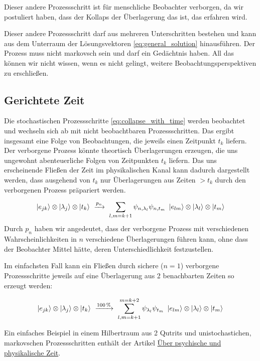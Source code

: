 \documentclass[12pt]{article}
\begin{document}
Dieser andere Prozessschritt ist für menschliche Beobachter verborgen, da wir postuliert haben, dass der Kollaps der Überlagerung das ist, das erfahren wird. 

Dieser andere Prozessschritt darf aus mehreren Unterschritten bestehen und kann aus dem Unterraum der Lösungsvektoren \eqref{eq:general_solution} hinausführen. Der Prozess muss nicht markovsch sein und darf ein Gedächtnis haben. All das können wir nicht wissen, wenn es nicht gelingt, weitere Beobachtungsperspektiven zu erschließen. 

\subsection{Gerichtete Zeit}

Die stochastischen Prozessschritte \eqref{eq:collapse_with_time} werden beobachtet und wechseln sich ab mit nicht beobachtbaren Prozessschritten. Das ergibt insgesamt eine Folge von Beobachtungen, die jeweils einen Zeitpunkt $t_k$ liefern. Der verborgene Prozess könnte theortisch Überlagerungen erzeugen, die uns ungewohnt abenteuerliche Folgen von Zeitpunkten $t_k$ liefern. Das uns erscheinende Fließen der Zeit im physikalischen Kanal kann dadurch dargestellt werden, dass ausgehend von $t_k$ nur Überlagerungen aus Zeiten $> t_k$ durch den verborgenen Prozess präpariert werden.

\begin{equation} 
\label{eq:preparation_with_time}
\ket{e_{jk}} \otimes \ket{\lambda_j} \otimes \ket{t_k}
\ \xrightarrow{p_{n}}\ 
\sum_{l,m=k+1} \psi_{n,\lambda_l}\psi_{n,t_m} \ \ket{e_{lm}} \otimes \ket{\lambda_l} \otimes \ket{t_m} 
\end{equation}
Durch $p_n$ haben wir angedeutet, dass der verborgene Prozess mit verschiedenen  Wahrscheinlichkeiten in $n$ verschiedene Überlagerungen führen kann, ohne dass der Beobachter Mittel hätte, deren Unterschiedlichkeit festzustellen.

Im einfachsten Fall kann ein Fließen durch sichere ($n=1$) verborgene Prozessschritte jeweils auf eine Überlagerung aus 2 benachbarten Zeiten so erzeugt werden:

\begin{equation*} 
\ket{e_{jk}} \otimes \ket{\lambda_j} \otimes \ket{t_k}
\ \xrightarrow{100\,\%}\ 
\sum_{l,m=k+1}^{m=k+2} \psi_{\lambda_l}\psi_{t_m} \ \ket{e_{lm}} \otimes \ket{\lambda_l} \otimes \ket{t_m} 
\end{equation*}

Ein einfaches Beispiel in einem Hilbertraum aus 2 Qutrits und unistochastichen, markovschen Prozessschritten enthält der Artikel \href{http://vermaschung.de/index.php?title=Warum_Panpsychismus%3F}{Über psychische und physikalische Zeit}. 
\end{document}
